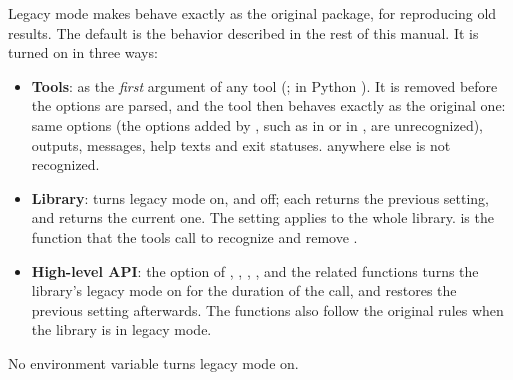 Legacy mode makes \wfdbx{} behave exactly as the original package, for
reproducing old results. The default is the behavior described in the rest
of this manual. It is turned on in three ways:
\begin{itemize}
\item \textbf{Tools}:  as the \emph{first} argument of any tool
  (; in Python ). It is removed before the options are parsed, and the tool
  then behaves exactly as the original one: same options (the options added
  by \wfdbx{}, such as  in  or  in ,
  are unrecognized), outputs, messages, help texts and exit statuses.
   anywhere else is not recognized.
\item \textbf{Library}:  turns legacy mode on,
  and  off; each returns the previous setting,
  and  returns the current one. The setting applies
  to the whole library.  is the function that the
  tools call to recognize and remove .
\item \textbf{High-level API}: the  option of ,
  , , ,
   and the related functions turns the library's
  legacy mode on for the duration of the call, and restores the previous
  setting afterwards. The functions also follow the original rules when the
  library is in legacy mode.
\end{itemize}
No environment variable turns legacy mode on.

